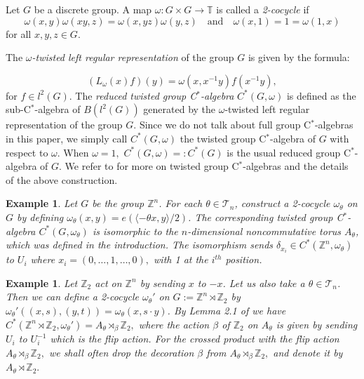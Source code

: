\documentclass[9pt, BCOR=2mm]{amsart}
\numberwithin{equation}{section}
\numberwithin{equation}{section}
\newtheorem{example}[theorem]{Example}
\newcommand{\Z}{{\mathbb{Z}}}
\begin{document}
	Let $G$ be a discrete group.  A map $\omega: G\times G \to \mathbb{T}$ is called a \emph{2-cocycle} if 
$$ \omega(x, y) \omega(xy, z)= \omega(x, yz) \omega(y, z) \quad \text{and}  \quad \omega(x, 1) = 1 = \omega(1, x)\label{units}
\label{cocycle}
$$
for all  $x, y, z \in G .$


The \emph{$\omega$-twisted left regular representation} of the group $G$ is given by the formula:

$$(L_{\omega}(x)f)(y) = \omega(x, x^{-1}y)f(x^{-1}y),$$ for $f \in l^2(G)$. The \emph{reduced twisted group C$^*$-algebra} $C^*(G,\omega)$  is defined as the sub-C$^*$-algebra of $B(l^2(G))$ generated by the $\omega$-twisted left regular representation of the group $G$. Since we do not talk about full group C$^*$-algebras in this paper, we simply call $C^*(G,\omega)$ the twisted group C$^*$-algebra of $G$ with respect to $\omega.$ When $\omega=1,$ $C^*(G,\omega)=:C^*(G)$ is the usual reduced group C$^*$-algebra of $G.$  We refer to \cite[Section 1]{ELPW10} for more on twisted group C$^*$-algebras and the details of the above construction. 

\begin{example}\label{ex:nt}
	\normalfont
Let $G$ be the group $\Z^n$. For each $\theta \in \mathcal{T}_{n}$, construct a 2-cocycle $\omega_\theta$ on $G$ by defining $\omega_\theta(x, y) = e(\langle -\theta x,y \rangle/2 )$. The corresponding twisted group C$^*$-algebra $C^*(G, \omega_\theta)$ is isomorphic to the $n$-dimensional noncommutative torus $A_\theta$, which was defined in the introduction. The isomorphism sends $ \delta_{x_i} \in C^*(\Z^n, \omega_\theta)$ to $U_i$ where $x_i = (0, \ldots, 1, \ldots, 0),$ with 1 at the $i^{th}$ position.   

  \end{example}
\begin{example}\label{ex:orbifold}
\normalfont
 Let $\Z_2$ act on $\Z^n$ by sending $x$ to $-x$. Let us also take a $\theta \in \mathcal{T}_{n}$.  Then we can define a 2-cocycle $\omega_\theta '$ on $G:=\Z^n \rtimes \Z_2$ by $\omega_\theta '((x,s),(y,t)) = \omega_\theta (x,s\cdot y)$. By Lemma 2.1 of \cite{ELPW10} we have $C^*(\Z^n\rtimes \Z_2, \omega_\theta ') = A_{\theta} \rtimes_\beta \Z_2,$ where the action $\beta$ of $\Z_2$ on $A_\theta$ is given by sending $U_i$ to $U_i^{-1}$ which is the \emph{flip action}. For the crossed product with the flip action $A_{\theta} \rtimes_\beta \Z_2,$ we shall often drop the decoration $\beta$ from $A_{\theta} \rtimes_\beta \Z_2,$ and denote it by $A_{\theta} \rtimes \Z_2.$   
 \end{example}
 
\end{document}

